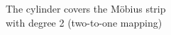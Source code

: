 \documentclass[preview]{standalone}
\begin{document}
\begin{center}
The cylinder covers the Möbius strip\\with degree 2 (two-to-one mapping)
\end{center}
\end{document}
